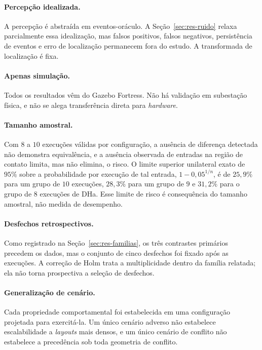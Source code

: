 \paragraph*{Percepção idealizada.} A percepção é abstraída em eventos-oráculo. A
Seção~\ref{sec:res-ruido} relaxa parcialmente essa idealização, mas falsos positivos,
falsos negativos, persistência de eventos e erro de localização permanecem fora do
estudo. A transformada de localização é fixa.

\paragraph*{Apenas simulação.} Todos os resultados vêm do Gazebo Fortress. Não há
validação em subestação física, e não se alega transferência direta para
\textit{hardware}.

\paragraph*{Tamanho amostral.} Com $8$ a $10$ execuções válidas por configuração, a
ausência de diferença detectada não demonstra equivalência, e a ausência observada de
entradas na região de contato limita, mas não elimina, o risco. O limite superior
unilateral exato de $95\%$ sobre a probabilidade por execução de tal entrada,
$1-0{,}05^{1/n}$, é de $25{,}9\%$ para um grupo de $10$ execuções, $28{,}3\%$ para um
grupo de $9$ e $31{,}2\%$ para o grupo de $8$ execuções de DHa. Esse limite de risco é
consequência do tamanho amostral, não medida de desempenho.

\paragraph*{Desfechos retrospectivos.} Como registrado na
Seção~\ref{sec:res-familias}, os três contrastes primários precedem os dados, mas o
conjunto de cinco desfechos foi fixado após as execuções. A correção de Holm trata a
multiplicidade dentro da família relatada; ela não torna prospectiva a seleção de
desfechos.

\paragraph*{Generalização de cenário.} Cada propriedade comportamental foi
estabelecida em uma configuração projetada para exercitá-la. Um único cenário adverso
não estabelece escalabilidade a \textit{layouts} mais densos, e um único cenário de
conflito não estabelece a precedência sob toda geometria de conflito.

